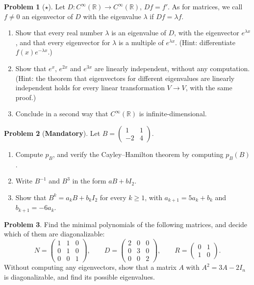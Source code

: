 \documentclass[11pt]{article}
\theoremstyle{definition}
\newtheorem{problem}{Problem}[section]
\newcommand{\mandatory}{\textcolor{red!70!black}{\textbf{Mandatory}}}
\begin{document}
\begin{problem}[$\star$]\label{pr:exp-eigen}
    Let $D: C^\infty(\mathbb{R}) \to C^\infty(\mathbb{R})$, $Df = f'$. As for matrices, we call $f \neq 0$ an eigenvector of $D$ with the eigenvalue $\lambda$ if $Df = \lambda f$.
    \begin{enumerate}[label=(\alph*)]
        \item Show that every real number $\lambda$ is an eigenvalue of $D$, with the eigenvector $e^{\lambda x}$, and that every eigenvector for $\lambda$ is a multiple of $e^{\lambda x}$. (Hint: differentiate $f(x)e^{-\lambda x}$.)
        \item Show that $e^x$, $e^{2x}$ and $e^{3x}$ are linearly independent, without any computation. (Hint: the theorem that eigenvectors for different eigenvalues are linearly independent holds for every linear transformation $V \to V$, with the same proof.)
        \item Conclude in a second way that $C^\infty(\mathbb{R})$ is infinite-dimensional.
    \end{enumerate}
\end{problem}

\begin{problem}[\mandatory]\label{pr:cayley-hamilton}
    Let $B = \begin{pmatrix} 1 & 1 \\ -2 & 4 \end{pmatrix}$.
    \begin{enumerate}[label=(\alph*)]
        \item Compute $p_B$, and verify the Cayley--Hamilton theorem by computing $p_B(B)$.
        \item Write $B^{-1}$ and $B^3$ in the form $aB + bI_2$.
        \item Show that $B^k = a_kB + b_kI_2$ for every $k \geq 1$, with $a_{k+1} = 5a_k + b_k$ and $b_{k+1} = -6a_k$.
    \end{enumerate}
\end{problem}

\begin{problem}\label{pr:minimal-poly}
    Find the minimal polynomials of the following matrices, and decide which of them are diagonalizable:
    \[N = \begin{pmatrix} 1 & 1 & 0 \\ 0 & 1 & 0 \\ 0 & 0 & 1 \end{pmatrix}, \qquad D = \begin{pmatrix} 2 & 0 & 0 \\ 0 & 3 & 0 \\ 0 & 0 & 2 \end{pmatrix}, \qquad R = \begin{pmatrix} 0 & 1 \\ 1 & 0 \end{pmatrix}.\]
    Without computing any eigenvectors, show that a matrix $A$ with $A^2 = 3A - 2I_n$ is diagonalizable, and find its possible eigenvalues.
\end{problem}
\end{document}
